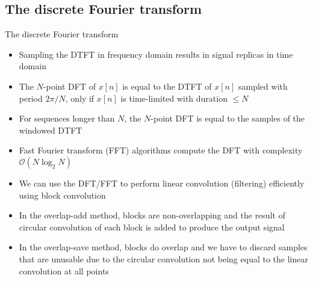 \documentclass[10pt, aspectratio=169]{beamer}
\begin{document}
\subsection{The discrete Fourier transform}
\begin{frame}{The discrete Fourier transform}
\begin{itemize}
	\item Sampling the DTFT in frequency domain results in signal replicas in time domain
	\item The $N$-point DFT of $x[n]$ is equal to the DTFT of $x[n]$ sampled with period $2\pi/N$, only if $x[n]$ is time-limited with duration $\leq N$
	\item For sequences longer than $N$, the $N$-point DFT is equal to the samples of the windowed DTFT
	\item Fast Fourier transform (FFT) algorithms compute the DFT with complexity $\mathcal{O}(N\log_2 N)$
	\item We can use the DFT/FFT to perform linear convolution (filtering) efficiently using block convolution
	\item In the overlap-add method, blocks are non-overlapping and the result of circular convolution of each block is added to produce the output signal
	\item In the overlap-save method, blocks do overlap and we have to discard samples that are unusable due to the circular convolution not being equal to the linear convolution at all points
\end{itemize}
\end{frame}
\end{document}
